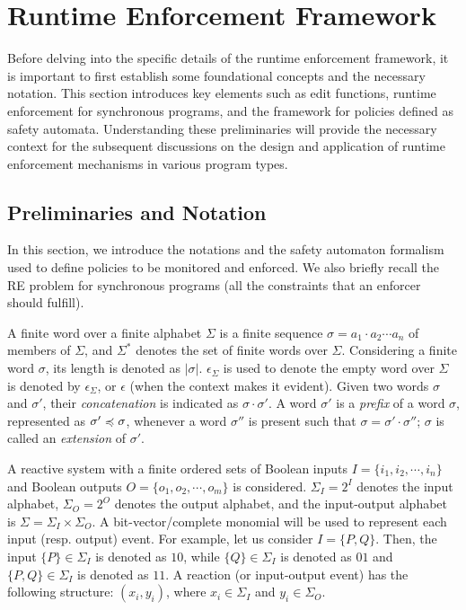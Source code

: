 
\chapter{Runtime Enforcement Framework}
\graphicspath{{Chapter_2/Vector/}{Chapter_2/}}

Before delving into the specific details of the runtime enforcement framework, it is important to first establish some foundational concepts and the necessary notation. This section introduces key elements such as edit functions, runtime enforcement for synchronous programs, and the framework for policies defined as safety automata. Understanding these preliminaries will provide the necessary context for the subsequent discussions on the design and application of runtime enforcement mechanisms in various program types.


\section{Preliminaries and Notation}
\label{prelim}

In this section, we introduce the notations and the safety automaton formalism used to define policies to be monitored and enforced. We also briefly recall the RE problem for synchronous programs (all the constraints that an enforcer should fulfill). 

A finite word over a finite alphabet $\Sigma$ is a finite sequence $\sigma = a_1\cdot a_2\cdots a_n$ of members of $\Sigma$, and $\Sigma^*$ denotes the set of finite words over $\Sigma$.
Considering a finite word $\sigma$, its length is denoted as  $|\sigma|$.
$\epsilon_\Sigma$ is used to denote the empty word over $\Sigma$ is denoted by $\epsilon_\Sigma$, or $\epsilon$ (when the context makes it evident).
Given two words $\sigma$ and $\sigma'$, their {\em concatenation} is indicated as $\sigma\cdot \sigma'$. 
A word $\sigma'$ is a {\em prefix} of a word $\sigma$, represented as $\sigma' \preccurlyeq \sigma$, whenever a word $\sigma''$ is present such that $\sigma = \sigma'\cdot \sigma''$; $\sigma$ is called an \emph{extension} of $\sigma'$.

A reactive system with a finite {ordered} sets of Boolean inputs $I= \{i_1, i_2,\cdots,i_n\}$ and Boolean outputs $O= \{o_1, o_2,\cdots,o_m\}$ is considered.
$\Sigma_I=2^I$ denotes the input alphabet, $\Sigma_O=2^O$ denotes the output alphabet, and the input-output alphabet is $\Sigma= \Sigma_I \times \Sigma_O$.
A bit-vector/complete monomial will be used to represent each input (resp. output) event.
For example, let us consider $I=\{P, Q\}$.
Then, the input $\{P\} \in \Sigma_I$ is denoted as  $10$, while $\{Q\} \in \Sigma_I$ is denoted as $01$ and  $\{P, Q\} \in \Sigma_I$ is denoted as $11$.
A reaction (or input-output event) has the following structure: $(x_i, y_i)$, where $x_i \in \Sigma_I$ and $y_i \in \Sigma_O$.

